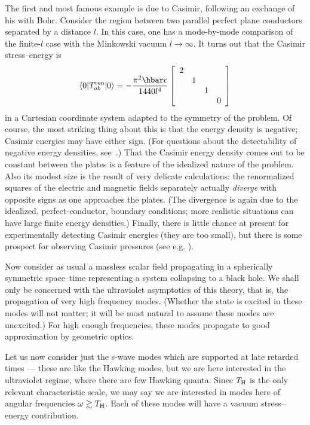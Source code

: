 \documentclass[12pt]{article}
\begin{document}
The first and most famous example is due to Casimir, following an exchange of his with Bohr.  Consider the region between two parallel  perfect plane conductors separated by a distance $l$.
In this case, one has a mode-by-mode comparison of the finite-$l$ case with the Minkowski vacuum $l\to\infty$.  It turns out that the Casimir stress--energy is
\begin{equation}\label{Cas}
  \langle 0 |T_{ab}^{\rm ren}|0\rangle =-\frac{\pi ^2\hbar c}{1440 l^4}\left[
  \begin{array}{cccc} 2&&&\\ &1&&\\ &&1&\\&&&0\end{array}\right]
\end{equation}
in a Cartesian coordinate system adapted to the symmetry of the problem.  Of course, the most striking thing about this is that the energy density is negative; Casimir energies may have either sign.
(For questions about the detectability of negative energy densities, see~\citep{Helfer:1998}.)  
That the Casimir energy density comes out to be constant between the plates is a feature of the idealized nature of the problem.  Also its modest size is the result of very delicate calculations:  the renormalized squares of the electric and magnetic fields separately actually {\em diverge} with opposite signs as one approaches the plates.  (The divergence is again due to the idealized, perfect-conductor, boundary conditions; more realistic situations can have large finite energy densities.)
Finally, there is little chance at present for experimentally detecting Casimir energies (they are too small), but there is some prospect for observing Casimir pressures (see e.g. \citep{Lamoreaux:2010,KM:2010}).

Now consider as usual a massless scalar field propagating in a spherically symmetric space--time representing a system collapsing to a black hole.  We shall only be concerned with the ultraviolet asymptotics of this theory, that is, the propagation of very high frequency modes.  (Whether the state is excited in these modes will not matter; it will be most natural to assume these modes are unexcited.)  For high enough frequencies, these modes propagate to good approximation by geometric optics.  

Let us now consider just the s-wave modes which are supported at late retarded times --- these are like the Hawking modes, but we are here interested in the ultraviolet regime, where there are few Hawking quanta.  Since $T_{\rm H}$ is the only relevant characteristic scale, we may say we are interested in modes here of angular frequencies $\omega\gtrsim T_{\rm H}$.  Each of these modes will have a vacuum stress--energy contribution.
\end{document}
